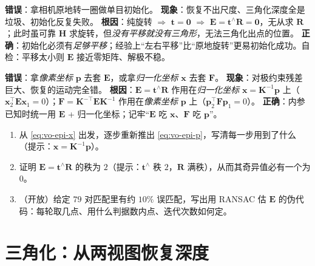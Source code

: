 \begin{pitfall}
\textbf{错误}：拿相机原地转一圈做单目初始化。
\textbf{现象}：恢复不出尺度、三角化深度全是垃圾、初始化反复失败。
\textbf{根因}：纯旋转 $\Rightarrow$ $\mathbf{t}=\mathbf{0}$ $\Rightarrow$ $\mathbf{E}=\mathbf{t}^\wedge\mathbf{R}=\mathbf{0}$，无从求 $\mathbf{R}$；此时虽可靠 $\mathbf{H}$ 求旋转，但\emph{没有平移就没有三角形}，无法三角化出点的位置。
\textbf{正确}：初始化必须有\emph{足够平移}；经验上“左右平移”比“原地旋转”更易初始化成功。自检：平移太小则 $\mathbf{E}$ 接近零矩阵、解极不稳。
\end{pitfall}

\begin{pitfall}
\textbf{错误}：拿\emph{像素坐标} $\mathbf{p}$ 去套 $\mathbf{E}$，或拿\emph{归一化坐标} $\mathbf{x}$ 去套 $\mathbf{F}$。
\textbf{现象}：对极约束残差巨大、恢复的运动完全错。
\textbf{根因}：$\mathbf{E}=\mathbf{t}^\wedge\mathbf{R}$ 作用在\emph{归一化坐标} $\mathbf{x}=\mathbf{K}^{-1}\mathbf{p}$ 上（$\mathbf{x}_2^\top\mathbf{E}\mathbf{x}_1=0$）；$\mathbf{F}=\mathbf{K}^{-\top}\mathbf{E}\mathbf{K}^{-1}$ 作用在\emph{像素坐标} $\mathbf{p}$ 上（$\mathbf{p}_2^\top\mathbf{F}\mathbf{p}_1=0$）。
\textbf{正确}：内参已知时统一用 $\mathbf{E}$ + 归一化坐标；记牢“$\mathbf{E}$ 吃 $\mathbf{x}$、$\mathbf{F}$ 吃 $\mathbf{p}$”。
\end{pitfall}

\begin{practice}
\begin{enumerate}
  \item 从 \cref{eq:vo-epi-x} 出发，逐步重新推出 \cref{eq:vo-epi-p}，写清每一步用到了什么（提示：$\mathbf{x}=\mathbf{K}^{-1}\mathbf{p}$）。
  \item 证明 $\mathbf{E}=\mathbf{t}^\wedge\mathbf{R}$ 的秩为 $2$（提示：$\mathbf{t}^\wedge$ 秩 $2$，$\mathbf{R}$ 满秩），从而其奇异值必有一个为 $0$。
  \item （开放）给定 $79$ 对匹配里有约 $10\%$ 误匹配，写出用 RANSAC 估 $\mathbf{E}$ 的伪代码：每轮取几点、用什么判据数内点、迭代次数如何定。
\end{enumerate}
\end{practice}

\section{三角化：从两视图恢复深度}
\label{sec:vo-triangulation}

